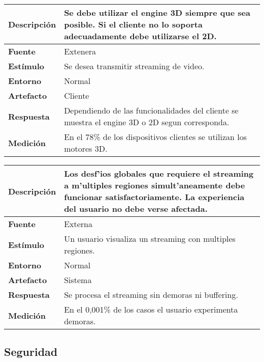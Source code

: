 \begin{center}
  \begin{tabular}{| l | p{10cm} | }
    \hline
  \textbf{Descripción} & Se debe utilizar el engine 3D siempre que sea posible. Si el cliente no lo soporta adecuadamente debe utilizarse el 2D.\\  \hline
  \textbf{Fuente} & Extenera\\  \hline
  \textbf{Estímulo} & Se desea transmitir streaming de video.\\  \hline
  \textbf{Entorno} & Normal\\  \hline
  \textbf{Artefacto} & Cliente\\  \hline
  \textbf{Respuesta} & Dependiendo de las funcionalidades del cliente se muestra el engine 3D o 2D segun corresponda.\\  \hline
  \textbf{Medición} & En el 78\% de los dispositivos clientes se utilizan los motores 3D.\\  \hline
  \end{tabular}
\end{center} 



\begin{center}
  \begin{tabular}{| l | p{10cm} | }
    \hline
  \textbf{Descripción} & Los desf'ios globales que requiere el streaming a m'ultiples regiones simult'aneamente debe funcionar satisfactoriamente. La experiencia del usuario no debe verse afectada.\\  \hline
  \textbf{Fuente} & Externa\\  \hline
  \textbf{Estímulo} & Un usuario visualiza un streaming con multiples regiones.\\  \hline
  \textbf{Entorno} & Normal\\  \hline
  \textbf{Artefacto} & Sistema\\  \hline
  \textbf{Respuesta} & Se procesa el streaming sin demoras ni buffering.\\  \hline
  \textbf{Medición} & En el 0,001\% de los casos el usuario experimenta demoras.\\  \hline
  \end{tabular}
\end{center} 


\subsection{Seguridad}

